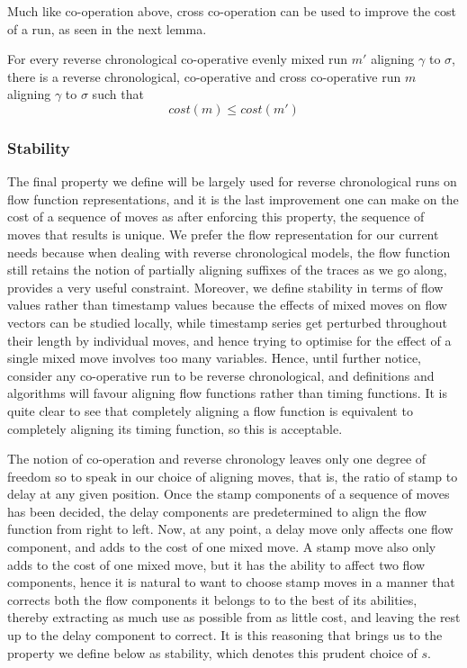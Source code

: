 \documentclass[runningheads]{llncs}
\begin{document}
	Much like co-operation above, cross co-operation can be used to improve the cost of a run, as seen in the next lemma. 
	
	\begin{lemma}\label{crosscoop}
		For every reverse chronological co-operative evenly mixed run $m'$ aligning $\gamma$ to $\sigma$, there is a reverse chronological, co-operative and cross co-operative run $m$ aligning $\gamma$ to $\sigma$ such that $$cost(m) \leq cost(m')$$
	\end{lemma}

	\subsubsection{Stability}
	
	The final property we define will be largely used for reverse chronological runs on flow function representations, and it is the last improvement one can make on the cost of a sequence of moves as after enforcing this property, the sequence of moves that results is unique. 
	We prefer the flow representation for our current needs because when dealing with reverse chronological models, the flow function still retains the notion of partially aligning suffixes of the traces as we go along, provides a very useful constraint. 
	Moreover, we define stability in terms of flow values rather than timestamp values because the effects of mixed moves on flow vectors can be studied locally, while timestamp series get perturbed throughout their length by individual moves, and hence trying to optimise for the effect of a single mixed move involves too many variables. 
	Hence, until further notice, consider any co-operative run to be reverse chronological, and definitions and algorithms will favour aligning flow functions rather than timing functions. 
	It is quite clear to see that completely aligning a flow function is equivalent to completely aligning its timing function, so this is acceptable. 
	
	The notion of co-operation and reverse chronology leaves only one degree of freedom so to speak in our choice of aligning moves, that is, the ratio of stamp to delay at any given position. Once the stamp components of a sequence of moves has been decided, the delay components are predetermined to align the flow function from right to left. 
	Now, at any point, a delay move only affects one flow component, and adds to the cost of one mixed move.
	A stamp move also only adds to the cost of one mixed move, but it has the ability to affect two flow components, hence it is natural to want to choose stamp moves in a manner that corrects both the flow components it belongs to to the best of its abilities, thereby extracting as much use as possible from as little cost, and leaving the rest up to the delay component to correct. 
	It is this reasoning that brings us to the property we define below as stability, which denotes this prudent choice of $s$. 
	
\end{document}
